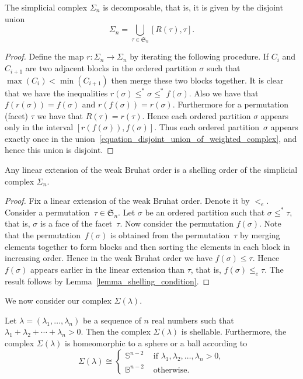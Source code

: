 \documentclass[ALCO,ThmDefs,Unicode,epreuves]{cedram}
\newcommand{\Bbbb}{\mathbb{B}}
\newcommand{\Sss}{\mathbb{S}}
\newcommand{\Sym}{\mathfrak{S}}
\newcommand{\lambdasumpositive}
{\lambda_{1} + \lambda_{2} + \cdots + \lambda_{n} > 0}
\begin{document}
\begin{prop}[Bj\"orner]
The simplicial complex $\Sigma_{n}$
is decomposable, that is, it is
given by the disjoint union
\begin{equation}
     \Sigma_{n} = \bigcup_{\tau \in \Sym_{n}} [R(\tau), \tau] .
\label{equation_disjoint_union_of_weighted_complex}
\end{equation}
\label{proposition_Sigma_decomposition}
\end{prop}
\begin{proof}
Define the map $r : \Sigma_{n} \longrightarrow \Sigma_{n}$
by iterating the following procedure.
If $C_{i}$ and $C_{i+1}$ are two adjacent blocks in the ordered partition $\sigma$
such that $\max(C_{i}) < \min(C_{i+1})$ then
merge these two blocks together.
It is clear that we have the inequalities
$r(\sigma) \leq^{*} \sigma \leq^{*} f(\sigma)$.
Also we have that $f(r(\sigma)) = f(\sigma)$
and $r(f(\sigma)) = r(\sigma)$.
Furthermore for a permutation (facet) $\tau$ we have that
$R(\tau) = r(\tau)$.
Hence each ordered partition
$\sigma$ appears only in the interval $[r(f(\sigma)), f(\sigma)]$.
Thus each ordered partition~$\sigma$ appears
exactly once 
in the union~\eqref{equation_disjoint_union_of_weighted_complex},
and hence this union is disjoint.
\end{proof}


\begin{theorem}[Bj\"orner]
Any linear extension of the weak Bruhat order is
a shelling order of the simplicial complex $\Sigma_{n}$.
\label{theorem_linear_extension_of_Bruhat_order}
\end{theorem}
\begin{proof}
Fix a linear extension of the weak Bruhat order.
Denote it by $<_{e}$.
Consider a permutation~$\tau \in \Sym_{n}$.
Let $\sigma$ be an ordered partition
such that $\sigma \leq^{*} \tau$,
that is, $\sigma$ is a face of the facet~$\tau$.
Now consider the permutation $f(\sigma)$.
Note that the permutation~$f(\sigma)$ is obtained from
the permutation~$\tau$ by merging elements together
to form blocks
and then sorting the elements in each block in increasing order.
Hence in the weak Bruhat order we have
$f(\sigma) \leq \tau$.
Hence $f(\sigma)$ appears earlier in the linear extension than $\tau$,
that is, $f(\sigma) \leq_{e} \tau$.
The result follows by
Lemma~\ref{lemma_shelling_condition}.
\end{proof}


We now consider our complex $\Sigma(\lambda)$.
\begin{theorem}
Let $\lambda = (\lambda_{1}, \ldots, \lambda_{n})$ be a sequence of
$n$ real numbers
such that $\lambdasumpositive$.
Then the complex $\Sigma(\lambda)$ is shellable.
Furthermore,
the complex $\Sigma(\lambda)$ is homeomorphic to a sphere or a ball
according to
$$
\Sigma(\lambda)
\cong
\begin{cases}
\Sss^{n-2} & \text{ if } \lambda_{1}, \lambda_{2}, \ldots, \lambda_{n} > 0, \\
\Bbbb^{n-2} & \text{ otherwise. }
\end{cases}
$$
\label{theorem_lots_of_shellings}
\end{theorem}
\end{document}
